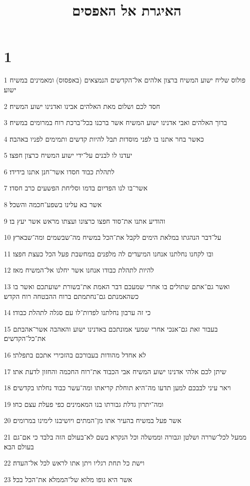 

\title{האיגרת אל האפסים}


\chapter{1}

\par 1 פולוס שליח ישוע המשיח ברצון אלהים אל־הקדשים הנמצאים (באפסוס) ומאמינים במשיח ישוע׃
\par 2 חסד לכם ושלום מאת האלהים אבינו ואדנינו ישוע המשיח׃
\par 3 ברוך האלהים ואבי אדנינו ישוע המשיח אשר ברכנו בכל־ברכת רוח במרומים במשיח׃
\par 4 כאשר בחר אתנו בו לפני מוסדות תבל להיות קדשים ותמימים לפניו באהבה׃
\par 5 יעדנו לו לבנים על־ידי ישוע המשיח כרצון חפצו׃
\par 6 לתהלת כבוד חסדו אשר־חנן אתנו בידידו׃
\par 7 אשר־בו לנו הפדיום בדמו וסליחת הפשעים כרב חסדו׃
\par 8 אשר בא עלינו בשפע־חכמה והשכל׃
\par 9 והודיע אתנו את־סוד חפצו כרצונו ועצתו מראש אשר יעץ בו׃
\par 10 על־דבר הנהגתו במלאת הימים לקבל את־הכל במשיח מה־שבשמים ומה־שבארץ׃
\par 11 ובו לקחנו נחלתנו אנחנו המיעדים לה מלפנים במחשבת פעל הכל כעצת חפצו׃
\par 12 להיות לתהלת כבודו אנחנו אשר יחלנו אל־המשיח מאז׃
\par 13 ואשר גם־אתם שתולים בו אחרי שמעכם דבר האמת את־בשורת ישועתכם ואשר בו כשהאמנתם גם־נחתמתם ברוח ההבטחה רוח הקדש׃
\par 14 כי זה ערבון נחלתנו לפדות־לו עם סגלה לתהלת כבודו׃
\par 15 בעבור זאת גם־אנכי אחרי שמעי אמונתכם באדנינו ישוע והאהבה אשר־אהבתם את־כל־הקדשים׃
\par 16 לא אחדל מהודות בעבורכם בהזכירי אתכם בתפלתי׃
\par 17 שיתן לכם אלהי אדנינו ישוע המשיח אבי הכבוד את־רוח החכמה והחזון לדעת אתו׃
\par 18 ויאר עיני לבבכם למען תדעו מה־היא תוחלת קריאתו ומה־עשר כבוד נחלתו בקדשים׃
\par 19 ומה־יתרון גדלת גבורתו בנו המאמינים כפי פעלת עצם כחו׃
\par 20 אשר פעל במשיח בהעיר אתו מן־המתים ויושיבנו לימינו במרומים׃
\par 21 ממעל לכל־שררה ושלטן וגבורה וממשלה וכל הנקרא בשם לא־בעולם הזה בלבד כי אם־גם בעולם הבא׃
\par 22 וישת כל תחת רגליו ויתן אתו לראש לכל אל־העדה׃
\par 23 אשר היא גופו מלוא של־הממלא את־הכל בכל׃

